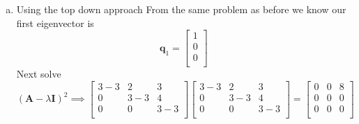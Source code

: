 \documentclass{article}
\begin{document}
\begin{enumerate}[a)]
\item Using the top down approach
\newline
\newline
From the same problem as before we know our first eigenvector is
$$
\mathbf{q}_1
=
\begin{bmatrix}
1 \\
0 \\
0 \\
\end{bmatrix}
$$
Next solve
$$(\mathbf{A} - \lambda\mathbf{I})^2
\implies
\begin{bmatrix}
3-3 & 2 & 3 \\
0 & 3-3 & 4 \\
0 & 0 & 3-3 \\
\end{bmatrix}
\begin{bmatrix}
3-3 & 2 & 3 \\
0 & 3-3 & 4 \\
0 & 0 & 3-3 \\
\end{bmatrix}
=
\begin{bmatrix}
0 & 0 & 8 \\
0 & 0 & 0 \\
0 & 0 & 0 \\
\end{bmatrix}
$$


\end{enumerate}
\end{document}

